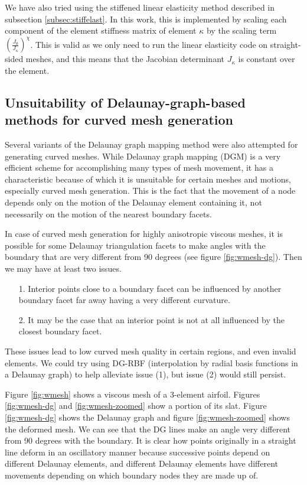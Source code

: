 We have also tried using the stiffened linear elasticity method described in subsection \ref{subsec:stiffelast}. In this work, this is implemented by scaling each component of the element stiffness matrix of element $\kappa$ by the scaling term $\left(\frac{J_0}{J_\kappa}\right)^\chi$. This is valid as we only need to run the linear elasticity code on straight-sided meshes, and this means that the Jacobian determinant $J_\kappa$ is constant over the element.

\subsection[Unsuitability of DG-based methods for curved mesh generation]{Unsuitability of Delaunay-graph-based methods for curved mesh generation}
\label{subsec:dgmunsuitable}

Several variants of the Delaunay graph mapping method were also attempted for generating curved meshes. While Delaunay graph mapping (DGM) is a very efficient scheme for accomplishing many types of mesh movement, it has a characteristic because of which it is unsuitable for certain meshes and motions, especially curved mesh generation. This is the fact that the movement of a node depends only on the motion of the Delaunay element containing it, not necessarily on the motion of the nearest boundary facets.

In case of curved mesh generation for highly anisotropic viscous meshes, it is possible for some Delaunay triangulation facets to make angles with the boundary that are very different from 90 degrees (see figure \ref{fig:wmesh-dg}). Then we may have at least two issues.
\begin{itemize}
	\item[1.] Interior points close to a boundary facet can be influenced by another boundary facet far away having a very different curvature.
	\item[2.] It may be the case that an interior point is not at all influenced by the closest boundary facet.
\end{itemize}
These issues lead to low curved mesh quality in certain regions, and even invalid elements. We could try using DG-RBF (interpolation by radial basis functions in a Delaunay graph) to help alleviate issue (1), but issue (2) would still persist.

Figure \ref{fig:wmesh} shows a viscous mesh of a 3-element airfoil. Figures \ref{fig:wmesh-dg} and \ref{fig:wmesh-zoomed} show a portion of its slat. Figure \ref{fig:wmesh-dg} shows the Delaunay graph and figure \ref{fig:wmesh-zoomed} shows the deformed mesh. We can see that the DG lines make an angle very different from 90 degrees with the boundary. It is clear how points originally in a straight line deform in an oscillatory manner because successive points depend on different Delaunay elements, and different Delaunay elements have different movements depending on which boundary nodes they are made up of.

